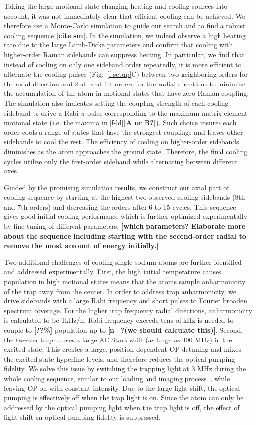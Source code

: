 \documentclass[aps,prl,twocolumn,groupedaddress]{revtex4-1}
\newcommand{\fxnote}[1]{{\textbf{[#1]}}}
\begin{document}
Taking the large motional-state changing heating and cooling sources into account,
it was not immediately clear that efficient cooling can be achieved.
We therefore use a Monte-Carlo simulation to guide our search and
to find a robust cooling sequence \fxnote{cite sm}.
In the simulation, we indeed observe a high heating rate due to the large Lamb-Dicke parameters
and confirm that cooling with higher-order Raman sidebands can suppress heating.
In particular, we find that instead of cooling on only one sideband order repeatedly,
it is more efficient to alternate the cooling pulses (Fig.~\ref{f-setup}C) between two
neighboring orders for the axial direction and 2nd- and 1st-orders for the radial directions
to minimize the accumulation of the atom in motional states that have zero Raman coupling.
The simulation also indicates setting the coupling strength of each cooling sideband
to drive a Rabi $\pi$ pulse corresponding to the maximum matrix element motional state
(i.e. the maxima in \ref{f-ld}\fxnote{A or B?}).
Such choice insures each order cools a range of states that have the strongest
couplings and leaves other sidebands to cool the rest.
The efficiency of cooling on higher-order sidebands diminishes
as the atom approaches the ground state.
Therefore, the final cooling cycles utilize only the first-order sideband
while alternating between different axes.

Guided by the promising simulation results,
we construct our axial part of cooling sequence by starting at the highest
two observed cooling sidebands (8th- and 7th-orders)
and decreasing the orders after 6 to 15 cycles.
This sequence gives good initial cooling performance which is further optimized experimentally
by fine tuning of different parameters. \fxnote{which parameters? Elaborate more about the sequence including starting with the second-order radial to remove the most amount of energy initially.}

Two additional challenges of cooling single sodium atoms are
further identified and addressed experimentally.
First, the high initial temperature causes population in high motional states
means that the atoms sample anharmonicity of the trap away from the center.
In order to address trap anharmonicity, we drive sidebands with a large Rabi frequency
and short pulses to Fourier broaden spectrum coverage.
For the higher trap frequency radial directions, anharmonicity is calculated to be 1kHz/n,
Rabi frequency exceeds tens of kHz is needed to couple to \fxnote{??\%} population up to
\fxnote{n=?(we should calculate this)}.
Second, the  tweezer trap  causes a large AC Stark shift (as large as $300$ MHz)
in the excited state. This creates  a large, position-dependent OP detuning
and mixes the excited-state hyperfine levels, and therefore reduces the optical pumping fidelity.
We solve this issue by switching the trapping light at 3 MHz during the whole cooling sequence,
similar to our loading and imaging process~\cite{Hutzler2017-LightShifts},
while leaving OP on with constant intensity.
Due to the large light shift, the optical pumping is effectively off when the trap light is on.
Since the atom can only be addressed by the optical pumping light when the trap light is off,
the effect of light shift on optical pumping fidelity is suppressed.
\end{document}
